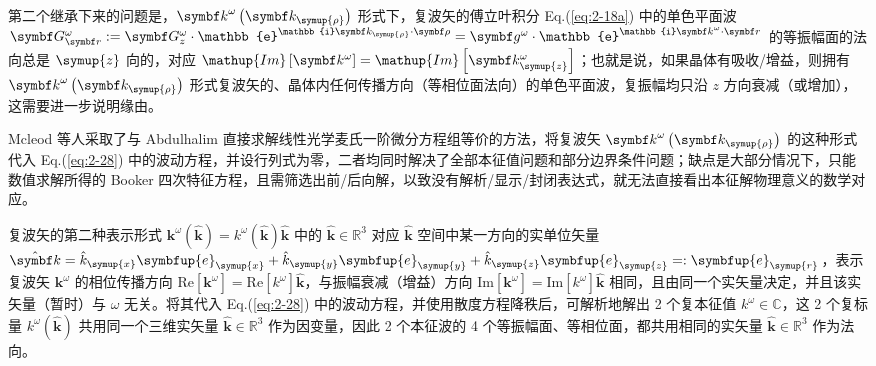 第二个继承下来的问题是，${\symbf k}^\omega \left( \symbf k_{\symup{\rho}} \right)$ 形式下，复波矢的傅立叶积分 Eq.(\ref{eq:2-18a}) 中的单色平面波 $\symbf G^{\omega}_{\symbf r} := \symbf G^{\omega}_z \cdot {\mathbb{e}^{\mathbb{i} \symbf k_{\symup{\rho}} \cdot \symbf \rho}} = \symbf g^{\omega} \cdot \mathbb{e}^{\mathbb{i} {\symbf k}^\omega \cdot \symbf r}$ 的等振幅面的法向总是 $\symup{z}$ 向的，对应 $\mathup{Im} \left[ \symbf k^\omega \right] = \mathup{Im} \left[ \symbf k^\omega_{\symup{z}} \right]$；也就是说，如果晶体有吸收/增益，则拥有 ${\symbf k}^\omega \left( \symbf k_{\symup{\rho}} \right)$ 形式复波矢的、晶体内任何传播方向（等相位面法向）的单色平面波，复振幅均只沿 $z$ 方向衰减（或增加），这需要进一步说明缘由。

Mcleod 等人采取了与 Abdulhalim 直接求解线性光学麦氏一阶微分方程组等价的方法，将复波矢 ${\symbf k}^\omega \left( \symbf k_{\symup{\rho}} \right)$ 的这种形式代入 Eq.(\ref{eq:2-28}) 中的波动方程，并设行列式为零，二者均同时解决了全部本征值问题和部分边界条件问题；缺点是大部分情况下，只能数值求解所得的 Booker 四次特征方程，且需筛选出前/后向解，以致没有解析/显示/封闭表达式，就无法直接看出本征解物理意义的数学对应。

复波矢的第二种表示形式 ${\symbf k}^\omega \left( \hat{\symbf k} \right) = k^\omega \left( \hat{\symbf k} \right) \hat{\symbf k}$ 中的 $\hat{\symbf k} \in \mathbb{R}^3$ 对应 $\hat{\symbf k}$ 空间中某一方向的实单位矢量 $\hat{\symbf k} = \hat{k}_{\symup{x}} \symbfup{e}_{\symup{x}} + \hat{k}_{\symup{y}} \symbfup{e}_{\symup{y}} + \hat{k}_{\symup{z}} \symbfup{e}_{\symup{z}} =: \symbfup{e}_{\symup{r}}$，表示复波矢 ${\symbf k}^\omega$ 的相位传播方向 $\mathup{Re} \left[ \symbf k^\omega \right] = \mathup{Re} \left[ k^\omega \right] \hat{\symbf k}$，与振幅衰减（增益）方向 $\mathup{Im} \left[ \symbf k^\omega \right] = \mathup{Im} \left[ k^\omega \right] \hat{\symbf k}$ 相同，且由同一个实矢量决定，并且该实矢量（暂时）与 $\omega$ 无关。将其代入 Eq.(\ref{eq:2-28}) 中的波动方程，并使用散度方程降秩后，可解析地解出 2 个复本征值 $k^\omega \in \mathbb{C}$，这 2 个复标量 $k^\omega \left( \hat{\symbf k} \right)$ 共用同一个三维实矢量 $\hat{\symbf k} \in \mathbb{R}^3$ 作为因变量，因此 2 个本征波的 4 个等振幅面、等相位面，都共用相同的实矢量 $\hat{\symbf k} \in \mathbb{R}^3$ 作为法向。

